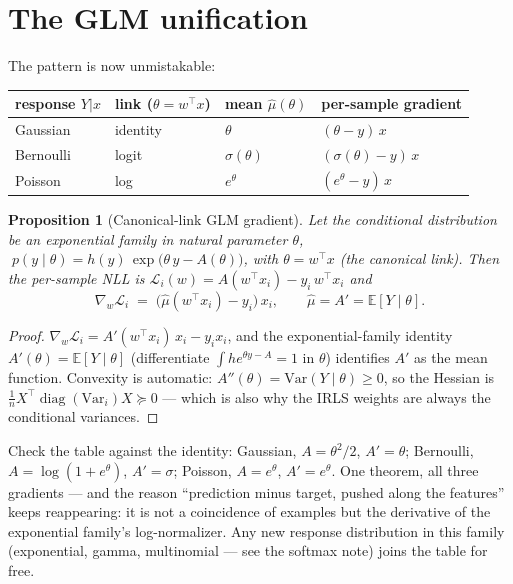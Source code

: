 \documentclass[11pt]{article}
\newtheorem{proposition}{Proposition}
\begin{document}
\section{The GLM unification}

The pattern is now unmistakable:
\begin{center}
\begin{tabular}{llll}
\toprule
response $Y|x$ & link ($\theta = w^\top x$) & mean $\hat\mu(\theta)$ &
per-sample gradient\\
\midrule
Gaussian & identity & $\theta$ & $(\theta - y)\,x$\\
Bernoulli & logit & $\sigma(\theta)$ & $(\sigma(\theta) - y)\,x$\\
Poisson & log & $e^{\theta}$ & $(e^{\theta} - y)\,x$\\
\bottomrule
\end{tabular}
\end{center}

\begin{proposition}[Canonical-link GLM gradient]
Let the conditional distribution be an exponential family in natural
parameter $\theta$,
$\;p(y \mid \theta) = h(y)\, \exp\bigl(\theta\, y - A(\theta)\bigr)$,
with $\theta = w^\top x$ (the \emph{canonical link}). Then the per-sample
NLL is $\mathcal{L}_i(w) = A(w^\top x_i) - y_i\, w^\top x_i$ and
\begin{equation}
  \boxed{\;\nabla_w \mathcal{L}_i
  \;=\; \bigl(\hat\mu(w^\top x_i) - y_i\bigr)\, x_i ,
  \qquad \hat\mu = A' = \mathbb{E}[Y\mid\theta].\;}
  \label{eq:glm}
\end{equation}
\end{proposition}

\begin{proof}
$\nabla_w \mathcal{L}_i = A'(w^\top x_i)\,x_i - y_i x_i$, and the
exponential-family identity $A'(\theta) = \mathbb{E}[Y\mid\theta]$
(differentiate $\int h e^{\theta y - A} = 1$ in $\theta$) identifies
$A'$ as the mean function. Convexity is automatic:
$A''(\theta) = \mathrm{Var}(Y\mid\theta) \ge 0$, so the Hessian is
$\tfrac1n X^\top \operatorname{diag}(\mathrm{Var}_i) X \succeq 0$ ---
which is also why the IRLS weights are always the conditional variances.
\end{proof}

Check the table against the identity: Gaussian, $A = \theta^2/2$,
$A' = \theta$; Bernoulli, $A = \log(1+e^{\theta})$, $A' = \sigma$;
Poisson, $A = e^{\theta}$, $A' = e^{\theta}$. One theorem, all three
gradients --- and the reason ``prediction minus target, pushed along the
features'' keeps reappearing: it is not a coincidence of examples but
the derivative of the exponential family's log-normalizer. Any new
response distribution in this family (exponential, gamma, multinomial
--- see the softmax note) joins the table for free.
\end{document}
